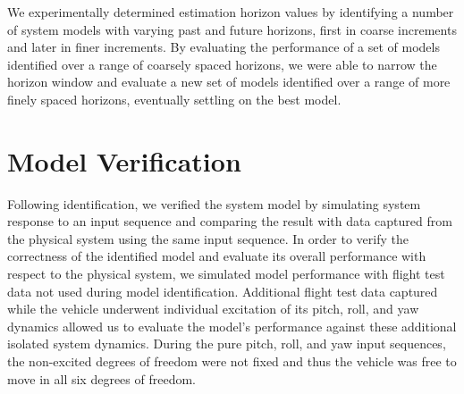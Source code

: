 We experimentally determined estimation horizon values by identifying a number of system models with varying past and future horizons, first in coarse increments and later in finer increments. By evaluating the performance of a set of models identified over a range of coarsely spaced horizons, we were able to narrow the horizon window and evaluate a new set of models identified  over a range of more finely spaced horizons, eventually settling on the best model. 


\section{Model Verification}
Following identification, we verified the system model by simulating system response to an input sequence and comparing the result with data captured from the physical system using the same input sequence. In order to verify the correctness of the identified model and evaluate its overall performance with respect to the physical system, we simulated model performance with flight test data not used during model identification. Additional flight test data captured while the vehicle underwent individual excitation of its pitch, roll, and yaw dynamics allowed us to evaluate the model's performance against these additional isolated system dynamics. During the pure pitch, roll, and yaw input sequences, the non-excited degrees of freedom were not fixed and thus the vehicle was free to move in all six degrees of freedom.























